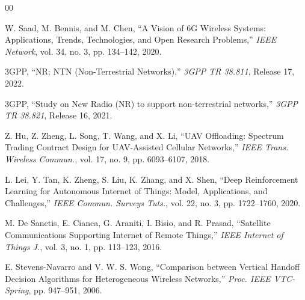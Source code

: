 \documentclass[conference]{IEEEtran}
\begin{document}
\begin{thebibliography}{00}

 W. Saad, M. Bennis, and M. Chen, ``A Vision of 6G Wireless Systems: Applications, Trends, Technologies, and Open Research Problems,'' \textit{IEEE Network}, vol. 34, no. 3, pp. 134--142, 2020.

 3GPP, ``NR; NTN (Non-Terrestrial Networks),'' \textit{3GPP TR 38.811}, Release 17, 2022.

 3GPP, ``Study on New Radio (NR) to support non-terrestrial networks,'' \textit{3GPP TR 38.821}, Release 16, 2021.

 Z. Hu, Z. Zheng, L. Song, T. Wang, and X. Li, ``UAV Offloading: Spectrum Trading Contract Design for UAV-Assisted Cellular Networks,'' \textit{IEEE Trans. Wireless Commun.}, vol. 17, no. 9, pp. 6093--6107, 2018.

 L. Lei, Y. Tan, K. Zheng, S. Liu, K. Zhang, and X. Shen, ``Deep Reinforcement Learning for Autonomous Internet of Things: Model, Applications, and Challenges,'' \textit{IEEE Commun. Surveys Tuts.}, vol. 22, no. 3, pp. 1722--1760, 2020.

 M. De Sanctis, E. Cianca, G. Araniti, I. Bisio, and R. Prasad, ``Satellite Communications Supporting Internet of Remote Things,'' \textit{IEEE Internet of Things J.}, vol. 3, no. 1, pp. 113--123, 2016.

 E. Stevens-Navarro and V. W. S. Wong, ``Comparison between Vertical Handoff Decision Algorithms for Heterogeneous Wireless Networks,'' \textit{Proc. IEEE VTC-Spring}, pp. 947--951, 2006.

\end{thebibliography}
\end{document}
